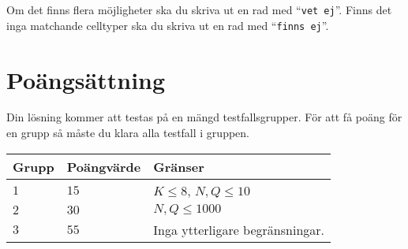 Om det finns flera möjligheter ska du skriva ut en rad med ``\texttt{vet ej}''.
Finns det inga matchande celltyper ska du skriva ut en rad med ``\texttt{finns ej}''.

\section*{Poängsättning}
Din lösning kommer att testas på en mängd testfallsgrupper.
För att få poäng för en grupp så måste du klara alla testfall i gruppen.

\noindent
\begin{tabular}{| l | l | l |}
\hline
Grupp & Poängvärde & Gränser \\ \hline
$1$     & $15$         & $ K \le 8$, $N, Q \leq 10$\\ \hline
$2$     & $30$         & $ N, Q \leq 1000$\\ \hline
$3$     & $55$         & Inga ytterligare begränsningar.\\ \hline
\end{tabular}
